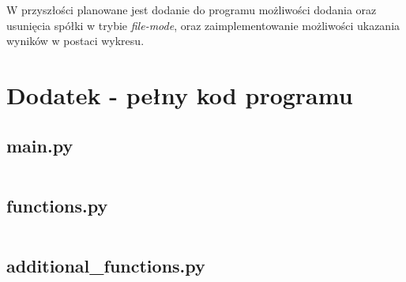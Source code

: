 \documentclass[magister]{dyplom}
\begin{document}
W przyszłości planowane jest dodanie do programu możliwości dodania oraz usunięcia spółki w trybie \textit{file-mode}, oraz zaimplementowanie możliwości ukazania wyników w postaci wykresu.

\appendixpage
\appendix

\chapter{Dodatek - pełny kod programu}\label{Dod1}

\section{main.py}
\inputminted[breaklines]{python}{the-wallet/main.py}

\section{functions.py}
\inputminted[breaklines]{python}{the-wallet/functions.py}

\section{additional\_functions.py}
\inputminted[breaklines]{python}{the-wallet/additional_functions.py}


\end{document}
